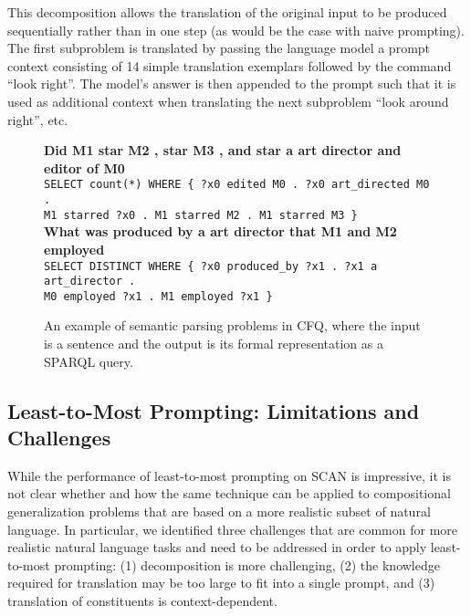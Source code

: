 \documentclass{article} \usepackage{iclr2022_conference,times}
\begin{document}
This decomposition allows the translation of the original input to be produced sequentially rather than in one step (as would be the case with naive prompting). The first subproblem is translated by passing the language model a prompt context consisting of 14 simple translation exemplars followed by the command ``look right''. The model's answer is then appended to the prompt such that it is used as additional context when translating the next subproblem ``look around right'', etc.

\begin{figure}[h!]
\begin{flushleft}
\small{
    \textbf{Did M1 star M2 , star M3 , and star a art director and editor of M0} \\
    \texttt{SELECT count(*) WHERE \{ ?x0 edited M0 . ?x0 art\_directed M0 .  \\
    \phantom{0000}M1 starred ?x0 . M1 starred M2 . M1 starred M3  \}} 
    \vspace{4mm} \\
    \textbf{What was produced by a art director that M1 and M2 employed} \\
    \texttt{SELECT DISTINCT WHERE \{ ?x0 produced\_by ?x1 . ?x1 a art\_director .  \\
    \phantom{0000}M0 employed ?x1 . M1 employed ?x1  \}}
}
\end{flushleft}
    \caption{An example of semantic parsing problems in CFQ, where the input is a sentence and the output is its formal representation as a SPARQL query.}
    \label{fig:cfq_examples}
\end{figure}


\subsection{Least-to-Most Prompting: Limitations and Challenges \label{sec:l2m_challenges}}

While the performance of least-to-most prompting on SCAN is impressive, it is not clear whether and how the same technique can be applied to compositional generalization problems that are based on a more realistic subset of natural language. In particular, we identified three challenges that are common for more realistic natural language tasks and need to be addressed in order to apply least-to-most prompting: (1) decomposition is more challenging, (2) the knowledge required for translation may be too large to fit into a single prompt, and (3) translation of constituents is context-dependent.
\end{document}

